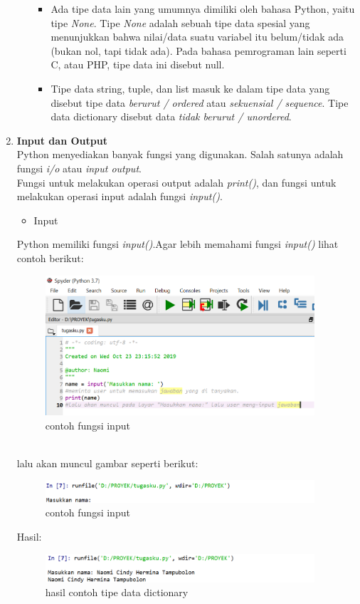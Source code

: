 \begin{enumerate}
\begin{itemize}
\begin{itemize}
\item Ada tipe data lain yang umumnya dimiliki oleh bahasa Python, yaitu tipe \textit{None}. Tipe \textit{None} adalah sebuah tipe data spesial yang menunjukkan bahwa nilai/data suatu variabel itu belum/tidak ada (bukan nol, tapi tidak ada). Pada bahasa pemrograman lain seperti C, atau PHP, tipe data ini disebut null.
\item Tipe data string, tuple, dan list masuk ke dalam tipe data yang disebut tipe data \textit{berurut / ordered} atau \textit{sekuensial / sequence}. Tipe data dictionary disebut data \textit{tidak berurut / unordered}.\\
\end{itemize}
\end{itemize}


\item \textbf{Input dan Output}\\
Python menyediakan banyak fungsi yang digunakan. Salah satunya adalah fungsi\textit{ i/o} atau \textit{input output}.\\
Fungsi untuk melakukan operasi output adalah \textit{print()}, dan fungsi untuk melakukan operasi input adalah fungsi \textit{input()}. 
\begin{itemize}

\item Input
\end{itemize}
Python memiliki fungsi \textit{input()}.Agar lebih memahami fungsi \textit{input()} lihat contoh berikut:
\begin{figure}[!htbp]
\centering
\includegraphics[width=10cm]{gambar2/cth7-1.png}
\caption{contoh fungsi input}
\end{figure}\\
    lalu akan muncul gambar seperti berikut:
\begin{figure}[!htbp]
\centering
\includegraphics[width=10cm]{gambar2/cth7-2.png}
\caption{contoh fungsi input}
\end{figure}
\newpage
Hasil:
\begin{figure}[!htbp]
\centering
\includegraphics[width=10cm]{gambar2/hsl7.png}
\caption{hasil contoh tipe data dictionary}
\end{figure}


\end{enumerate}
